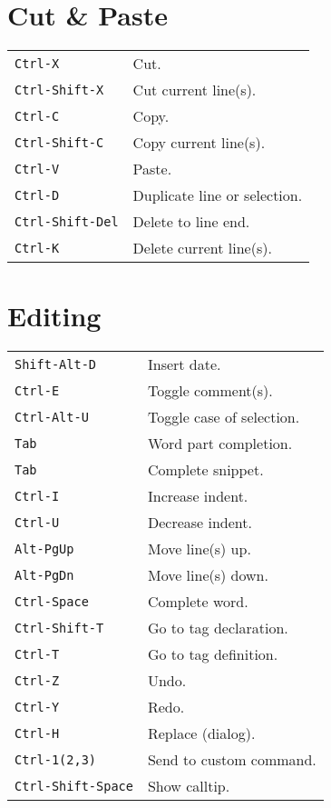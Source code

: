 \begin{multicols}{3}
\section{Cut \& Paste}
\begin{tabular}{@{}ll@{}}
	\verb!Ctrl-X! & Cut. \\
	\verb!Ctrl-Shift-X! & Cut current line(s). \\
	\verb!Ctrl-C! & Copy. \\
	\verb!Ctrl-Shift-C! & Copy current line(s). \\
	\verb!Ctrl-V! & Paste. \\
	\verb!Ctrl-D! & Duplicate line or selection. \\
	\verb!Ctrl-Shift-Del! & Delete to line end. \\
	\verb!Ctrl-K! & Delete current line(s). \\
\end{tabular}

\section{Editing}
\begin{tabular}{@{}ll@{}}
	\verb!Shift-Alt-D! & Insert date. \\
	\verb!Ctrl-E! & Toggle comment(s). \\
	\verb!Ctrl-Alt-U! & Toggle case of selection. \\
	\verb!Tab! & Word part completion. \\
	\verb!Tab! & Complete snippet. \\
	\verb!Ctrl-I! & Increase indent. \\
	\verb!Ctrl-U! & Decrease indent. \\
	\verb!Alt-PgUp! & Move line(s) up. \\
	\verb!Alt-PgDn! & Move line(s) down. \\
	\verb!Ctrl-Space! & Complete word. \\
	\verb!Ctrl-Shift-T! & Go to tag declaration. \\
	\verb!Ctrl-T! & Go to tag definition. \\
	\verb!Ctrl-Z! & Undo. \\
	\verb!Ctrl-Y! & Redo. \\
	\verb!Ctrl-H! & Replace (dialog). \\
	\verb!Ctrl-1(2,3)! & Send to custom command. \\
	\verb!Ctrl-Shift-Space! & Show calltip. \\
\end{tabular}


\end{multicols}
